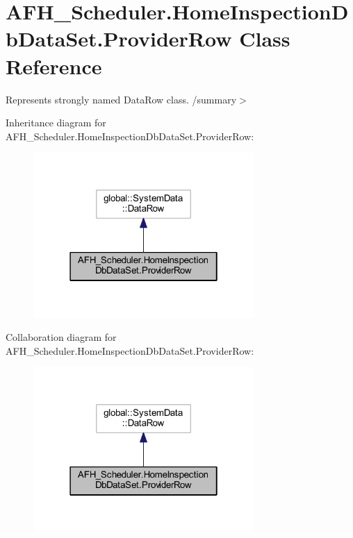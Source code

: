 \section{A\+F\+H\+\_\+\+Scheduler.\+Home\+Inspection\+Db\+Data\+Set.\+Provider\+Row Class Reference}
\label{class_a_f_h___scheduler_1_1_home_inspection_db_data_set_1_1_provider_row}


Represents strongly named Data\+Row class. /summary$>$  




Inheritance diagram for A\+F\+H\+\_\+\+Scheduler.\+Home\+Inspection\+Db\+Data\+Set.\+Provider\+Row\+:
\nopagebreak
\begin{figure}[H]
\begin{center}
\leavevmode
\includegraphics[width=238pt]{class_a_f_h___scheduler_1_1_home_inspection_db_data_set_1_1_provider_row__inherit__graph}
\end{center}
\end{figure}


Collaboration diagram for A\+F\+H\+\_\+\+Scheduler.\+Home\+Inspection\+Db\+Data\+Set.\+Provider\+Row\+:
\nopagebreak
\begin{figure}[H]
\begin{center}
\leavevmode
\includegraphics[width=238pt]{class_a_f_h___scheduler_1_1_home_inspection_db_data_set_1_1_provider_row__coll__graph}
\end{center}
\end{figure}
